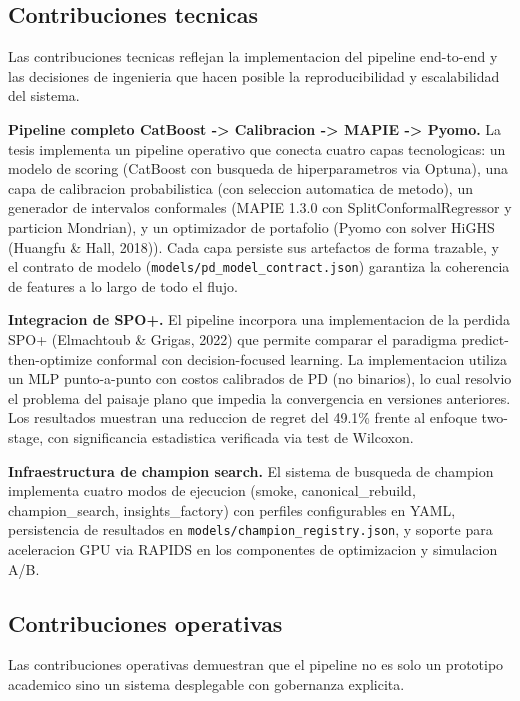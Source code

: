 \documentclass[
  spanish,
  11pt,
  letterpaper,
]{scrbook}
\theoremstyle{plain}
\theoremstyle{remark}
\begin{document}
\subsection{Contribuciones tecnicas}\label{sec-contrib-technical}

Las contribuciones tecnicas reflejan la implementacion del pipeline
end-to-end y las decisiones de ingenieria que hacen posible la
reproducibilidad y escalabilidad del sistema.

\textbf{Pipeline completo CatBoost -\textgreater{} Calibracion
-\textgreater{} MAPIE -\textgreater{} Pyomo.} La tesis implementa un
pipeline operativo que conecta cuatro capas tecnologicas: un modelo de
scoring (CatBoost con busqueda de hiperparametros via Optuna), una capa
de calibracion probabilistica (con seleccion automatica de metodo), un
generador de intervalos conformales (MAPIE 1.3.0 con
SplitConformalRegressor y particion Mondrian), y un optimizador de
portafolio (Pyomo con solver HiGHS (Huangfu \& Hall, 2018)). Cada capa
persiste sus artefactos de forma trazable, y el contrato de modelo
(\texttt{models/pd\_model\_contract.json}) garantiza la coherencia de
features a lo largo de todo el flujo.

\textbf{Integracion de SPO+.} El pipeline incorpora una implementacion
de la perdida SPO+ (Elmachtoub \& Grigas, 2022) que permite comparar el
paradigma predict-then-optimize conformal con decision-focused learning.
La implementacion utiliza un MLP punto-a-punto con costos calibrados de
PD (no binarios), lo cual resolvio el problema del paisaje plano que
impedia la convergencia en versiones anteriores. Los resultados muestran
una reduccion de regret del 49.1\% frente al enfoque two-stage, con
significancia estadistica verificada via test de Wilcoxon.

\textbf{Infraestructura de champion search.} El sistema de busqueda de
champion implementa cuatro modos de ejecucion (smoke,
canonical\_rebuild, champion\_search, insights\_factory) con perfiles
configurables en YAML, persistencia de resultados en
\texttt{models/champion\_registry.json}, y soporte para aceleracion GPU
via RAPIDS en los componentes de optimizacion y simulacion A/B.

\subsection{Contribuciones operativas}\label{sec-contrib-operational}

Las contribuciones operativas demuestran que el pipeline no es solo un
prototipo academico sino un sistema desplegable con gobernanza
explicita.
\end{document}
